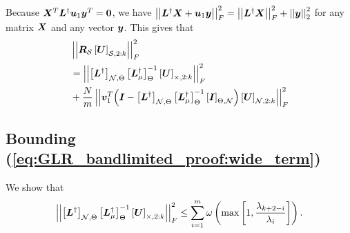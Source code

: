Because $\bm{X}^{T}\bm{L}^{\dagger}\bm{u}_{1}\bm{y}^{T} = \bm{0}$, we have $\left\lvert\left\lvert\bm{L}^{\dagger}\bm{X} + \bm{u}_{1}\bm{y}\right\rvert\right\rvert^{2}_{F} = \left\lvert\left\lvert\bm{L}^{\dagger}\bm{X}\right\rvert\right\rvert^{2}_{F} + \left\lvert\left\lvert\bm{y}\right\rvert\right\rvert^{2}_{2}$ for any matrix $\bm{X}$ and any vector $\bm{y}$.
This gives that
\begin{align} 
    &\sqfrob{\matr{R}_{\set{S}}\msubgen[\set{S},2:k]{\matr{U}}} \\ 
    &=  \sqfrob{\msubgen[\set{N},\Theta]{\matr{L}^{\dagger}} \msubgen[\Theta]{\matr{L}^{\dagger}_{\mu}}^{-1}\msubgen[\set{\Theta},2:k]{\matr{U}}} \label{eq:GLR_bandlimited_proof:wide_term} \\
    &+ {\frac{N}{m}}\sqfrob{\vect{v}_{1}^{T}{\left( \matr{I} - \msubgen[\set{N},\Theta]{\matr{L}^{\dagger}} \msubgen[\Theta]{ \matr{L}_{\mu}^{\dagger}}^{-1}\msubgen[\Theta,\set{N}]{\matr{I}}\right)\msubgen[\set{N},2:k]{\matr{U}}}} \label{eq:GLR_bandlimited_proof:v1_term}
\end{align}

\subsection{Bounding (\ref{eq:GLR_bandlimited_proof:wide_term})}
We show that
\begin{align}
    \sqfrob{\msubgen[\set{N},\Theta]{\matr{L}^{\dagger}} \msubgen[\Theta]{\matr{L}^{\dagger}_{\mu}}^{-1}\msubgen[\set{\Theta},2:k]{\matr{U}}} \leq 
\sum^{m}_{i=1}\omega\left(\max\left[1,\frac{\lambda_{k+2-i}}{\lambda_{i}}\right]\right).
\end{align}

